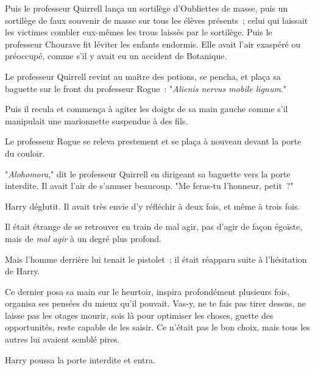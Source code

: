 Puis le professeur Quirrell lança un sortilège d'Oubliettes de masse, puis un sortilège de faux souvenir de masse sur tous les élèves présents~; celui qui laissait les victimes combler eux-mêmes les trous laissés par le sortilège. Puis le professeur Chourave fit léviter les enfants endormis. Elle avait l'air exaspéré ou préoccupé, comme s'il y avait eu un accident de Botanique.

Le professeur Quirrell revint au maître des potions, se pencha, et plaça sa baguette sur le front du professeur Rogue~: "\emph{Alienis nervus mobile lignum}."

Puis il recula et commença à agiter les doigts de sa main gauche comme s'il manipulait une marionnette suspendue à des fils.

Le professeur Rogue se releva prestement et se plaça à nouveau devant la porte du couloir.

"\emph{Alohomora}," dit le professeur Quirrell en dirigeant sa baguette vers la porte interdite. Il avait l'air de s'amuser beaucoup. "Me feras-tu l'honneur, petit~?"

Harry déglutit. Il avait très envie d'y réfléchir à deux fois, et même à trois fois.

Il était étrange de se retrouver en train de mal agir, pas d'agir de façon égoïste, mais de \emph{mal agir} à un degré plus profond.

Mais l'homme derrière lui tenait le pistolet~; il était réapparu suite à l'hésitation de Harry.

Ce dernier posa sa main sur le heurtoir, inspira profondément plusieurs fois, organisa ses pensées du mieux qu'il pouvait. Vas-y, ne te fais pas tirer dessus, ne laisse pas les otages mourir, sois là pour optimiser les choses, guette des opportunités, reste capable de les saisir. Ce n'était pas le bon choix, mais tous les autres lui avaient semblé pires.

Harry poussa la porte interdite et entra. 

